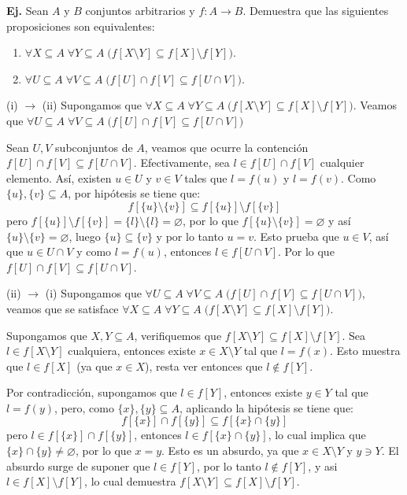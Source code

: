 \documentclass[letterpaper,DIV=14,headsepline,12pt]{scrartcl}
\makeatletter
\newcounter{Ejer}
\newcommand{\pts}{}
\newenvironment{ejercicio}[1]{\noindent
    \ifthenelse{\equal{#1}{1} \OR \equal{#1}{+1}}{\renewcommand{\pts}{\textbf{(#1 pt)}}}{\renewcommand{\pts}{\textbf{(#1 pts)}}}\textbf{Ej. \theEjer} \pts\stepcounter{Ejer}}{\vspace{.3cm}}
\renewcommand{\emptyset}{\varnothing}
\renewenvironment{proof}[1][]{%
        \par\pushQED{\qed}%
        \normalfont\topsep6pt \partopsep0pt %
        \trivlist
        \item[\hskip\labelsep
                \textbf{\textit{Demostración.}}%
        ]#1
        }{%
        \popQED\endtrivlist\@endpefalse
    }
\makeatother
\begin{document}
    \begin{ejercicio}{2.5}
        Sean $A$ y $B$ conjuntos arbitrarios y $f:A \to B$. Demuestra que las siguientes proposiciones son equivalentes:
        \begin{enumerate}
            \item $\forall X \subseteq A \; \forall Y \subseteq A \; \big( f[X \setminus Y] \subseteq f[X] \setminus f[Y] \big)$.
            \item $\forall U \subseteq A \; \forall V \subseteq A \; \big( f[U] \cap f[V] \subseteq f[U \cap V] \big)$.
        \end{enumerate}
    \end{ejercicio}
    \begin{proof}
        (i) $\to$ (ii) Supongamos que $\forall X \subseteq A \; \forall Y \subseteq A \; \big( f[X \setminus Y] \subseteq f[X] \setminus f[Y] \big)$. Veamos que $\forall U \subseteq A \; \forall V \subseteq A \; \big( f[U] \cap f[V] \subseteq f[U \cap V] \big)$
       
        Sean $U,V$ subconjuntos de $A$, veamos que ocurre la contención $f[U] \cap f[V] \subseteq f[U \cap V]$. Efectivamente, sea $l\in f[U] \cap f[V]$ cualquier elemento. Así, existen $u \in U$ y $v \in V$ tales que $l=f(u)$ y $l=f(v)$. Como $\{u\},\{v\} \subseteq A$, por hipótesis se tiene que:
        \[ f[\{u\} \setminus \{v\}]\subseteq f[\{u\}] \setminus f[\{v\}] \]
        pero $f[\{u\}]\setminus f[\{v\}] = \{l\} \setminus \{l\} = \emptyset$, por lo que $f[\{u\} \setminus \{v\}]=\emptyset$ y así $\{u\} \setminus \{v\}=\emptyset$, luego $\{u\} \subseteq \{v\}$ y por lo tanto $u=v$. Esto prueba que $u \in V$, así que $u \in U \cap V$ y como $l=f(u)$, entonces $l \in f[U \cap V]$. Por lo que $f[U] \cap f[V] \subseteq f[U \cap V]$.

        (ii) $\rightarrow$ (i) Supongamos que $\forall U \subseteq A \; \forall V \subseteq A \; \big( f[U] \cap f[V] \subseteq f[U \cap V] \big)$, veamos que se satisface $\forall X \subseteq A \; \forall Y \subseteq A \; \big( f[X \setminus Y] \subseteq f[X] \setminus f[Y] \big)$.

        Supongamos que $X,Y \subseteq A$, verifiquemos que $f[X \setminus Y] \subseteq f[X] \setminus f[Y]$. Sea $l \in f[X \setminus Y]$ cualquiera, entonces existe $x \in X \setminus Y$ tal que $l=f(x)$. Esto muestra que $l \in f[X]$ (ya que $x \in X$), resta ver entonces que $l \notin f[Y]$.

        Por contradicción, supongamos que $l \in f[Y]$, entonces existe $y \in Y$ tal que $l=f(y)$, pero, como $\{x\},\{y\} \subseteq A$, aplicando la hipótesis se tiene que:
        \[ f[\{x\}] \cap f[\{y\}] \subseteq f[\{x\} \cap \{y\}] \]
        pero $l \in f[\{x\}] \cap f[\{y\}]$, entonces $l \in f[\{x\} \cap \{y\}]$, lo cual implica que $\{x\} \cap \{y\} \neq \emptyset$, por lo que $x=y$. Esto es un absurdo, ya que $x \in X \setminus Y$ y $y \ni Y$. El absurdo surge de suponer que $l \in f[Y]$, por lo tanto $l \notin f[Y]$, y asi $l \in f[X]\setminus f[Y]$, lo cual demuestra $f[X \setminus Y] \subseteq f[X] \setminus f[Y]$.
    \end{proof}
\end{document}

